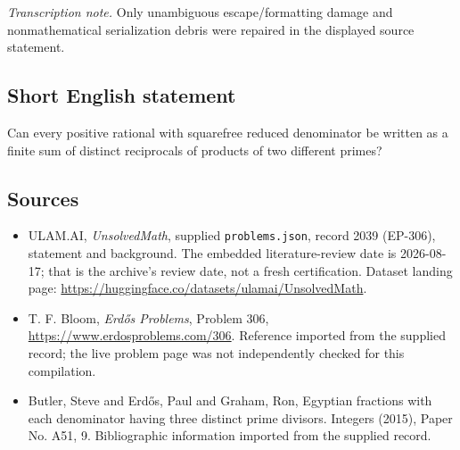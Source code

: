 \documentclass[11pt,a4paper]{article}
\begin{document}
{\small\emph{Transcription note.} Only unambiguous escape/formatting damage and nonmathematical serialization debris were repaired in the displayed source statement.}

\subsection{Short English statement}

Can every positive rational with squarefree reduced denominator be written as a finite sum of distinct reciprocals of products of two different primes?

\subsection{Sources}

{\small

\begin{itemize}

\item[\hypertarget{source:2039:1}{S1}] ULAM.AI, \emph{UnsolvedMath}, supplied \texttt{problems.json}, record 2039 (EP-306), statement and background. The embedded literature-review date is 2026-08-17; that is the archive’s review date, not a fresh certification. Dataset landing page: \url{https://huggingface.co/datasets/ulamai/UnsolvedMath}.

\item[\hypertarget{source:2039:2}{S2}] T. F. Bloom, \emph{Erdős Problems}, Problem 306, \url{https://www.erdosproblems.com/306}. Reference imported from the supplied record; the live problem page was not independently checked for this compilation.

\item[\hypertarget{source:2039:3}{S3}] Butler, Steve and Erd\H{o}s, Paul and Graham, Ron, Egyptian fractions with each denominator having three distinct prime divisors. Integers (2015), Paper No. A51, 9. Bibliographic information imported from the supplied record.

\end{itemize}

}

\label{end:2039}
\end{document}
